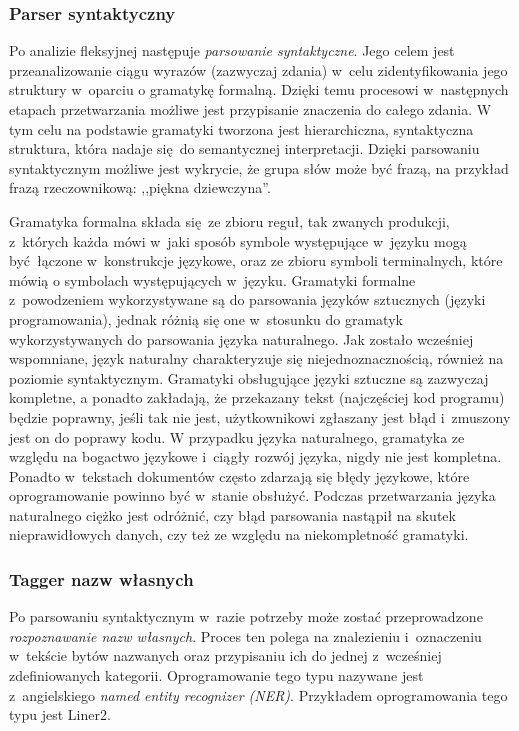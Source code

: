 \documentclass[a4paper, twoside, 12pt]{report}
\begin{document}
            \subsubsection{Parser syntaktyczny}
                Po analizie fleksyjnej następuje \emph{parsowanie syntaktyczne}. Jego celem jest przeanalizowanie ciągu wyrazów
                (zazwyczaj zdania) w~celu zidentyfikowania jego struktury w~oparciu o gramatykę formalną. Dzięki temu procesowi
                w~następnych etapach przetwarzania możliwe jest przypisanie znaczenia do całego zdania. W tym celu na podstawie
                gramatyki tworzona jest hierarchiczna, syntaktyczna struktura, która nadaje się do semantycznej interpretacji.
                Dzięki parsowaniu syntaktycznym możliwe jest wykrycie, że grupa słów może być frazą, na przykład frazą
                rzeczownikową: ,,piękna dziewczyna''.

                Gramatyka formalna składa się ze zbioru reguł, tak zwanych produkcji, z~których każda mówi w~jaki sposób symbole występujące
                w~języku mogą być łączone w~konstrukcje językowe, oraz ze zbioru symboli terminalnych, które mówią o symbolach występujących
                w~języku.
                Gramatyki formalne z~powodzeniem wykorzystywane są do parsowania języków sztucznych (języki programowania),
                jednak różnią się one w~stosunku do gramatyk wykorzystywanych do parsowania języka naturalnego. Jak zostało
                wcześniej wspomniane, język naturalny charakteryzuje się niejednoznacznością, również na poziomie syntaktycznym.
                Gramatyki obsługujące języki sztuczne są zazwyczaj kompletne, a ponadto zakładają, że przekazany tekst
                (najczęściej kod programu) będzie poprawny, jeśli tak nie jest, użytkownikowi zgłaszany jest błąd i~zmuszony
                jest on do poprawy kodu. W przypadku języka naturalnego, gramatyka ze względu na bogactwo językowe i~ciągły
                rozwój języka, nigdy nie jest kompletna. Ponadto w~tekstach dokumentów często zdarzają się błędy językowe,
                które oprogramowanie powinno być w~stanie obsłużyć. Podczas przetwarzania języka naturalnego ciężko jest odróżnić,
                czy błąd parsowania nastąpił na skutek nieprawidłowych danych, czy też ze względu na niekompletność gramatyki.

            \subsubsection{Tagger nazw własnych}
                Po parsowaniu syntaktycznym w~razie potrzeby może zostać przeprowadzone \emph{rozpoznawanie nazw własnych}. Proces
                ten polega na znalezieniu i~oznaczeniu w~tekście bytów nazwanych oraz przypisaniu ich do jednej z~wcześniej
                zdefiniowanych kategorii. Oprogramowanie tego typu nazywane jest z~angielskiego
                \emph{named entity recognizer (NER)}. Przykładem oprogramowania tego typu jest Liner2\cite{LINER2}.
\end{document}
